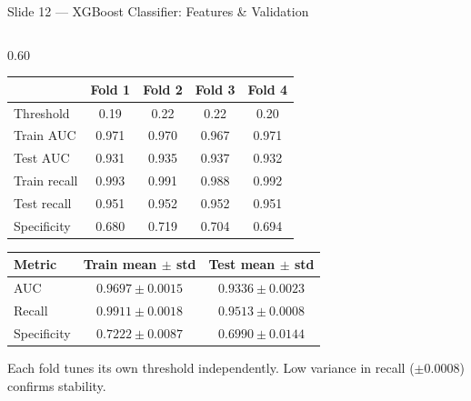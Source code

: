 \documentclass[aspectratio=169, 9pt]{beamer}
\begin{document}
\begin{frame}{Slide 12 --- XGBoost Classifier: Features \& Validation}
\begin{columns}[T]
\begin{column}{0.60\textwidth}
      \vspace{0.3em}
      {\small
      \begin{tabular}{@{} lcccc @{}}
        \toprule
        & Fold 1 & Fold 2 & Fold 3 & Fold 4 \\
        \midrule
        Threshold  & 0.19 & 0.22 & 0.22 & 0.20 \\
        Train AUC  & 0.971 & 0.970 & 0.967 & 0.971 \\
        Test AUC   & 0.931 & 0.935 & 0.937 & 0.932 \\
        Train recall & 0.993 & 0.991 & 0.988 & 0.992 \\
        Test recall  & 0.951 & 0.952 & 0.952 & 0.951 \\
        Specificity  & 0.680 & 0.719 & 0.704 & 0.694 \\
        \bottomrule
      \end{tabular}
      }

      \vspace{0.4em}
      {\small
      \begin{tabular}{@{} lcc @{}}
        \toprule
        Metric & Train mean $\pm$ std & Test mean $\pm$ std \\
        \midrule
        AUC         & $0.9697 \pm 0.0015$ & $0.9336 \pm 0.0023$ \\
        Recall      & $0.9911 \pm 0.0018$ & $0.9513 \pm 0.0008$ \\
        Specificity & $0.7222 \pm 0.0087$ & $0.6990 \pm 0.0144$ \\
        \bottomrule
      \end{tabular}
      }

      \vspace{0.3em}
      {\scriptsize\color{gray}
      Each fold tunes its own threshold independently.
      Low variance in recall ($\pm$0.0008) confirms stability.}
    \end{column}

  \end{columns}
\end{frame}
\end{document}
